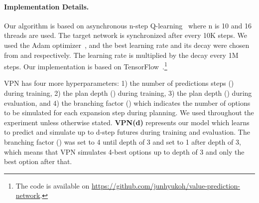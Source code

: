 \documentclass{article}
\newcommand{\cutparagraphup}{\vspace{-2pt}}
\begin{document}
\cutparagraphup
\paragraph{Implementation Details.}
Our algorithm is based on asynchronous n-step Q-learning~\citep{mnih2016asynchronous} where n is 10 and 16 threads are used. The target network is synchronized after every 10K steps. We used the Adam optimizer~\citep{Kingma2014AdamAM}, and the best learning rate and its decay were chosen from  and  respectively. The learning rate is multiplied by the decay every 1M steps. Our implementation is based on TensorFlow~\citep{Abadi2015TensorFlowLM}.\footnote{The code is available on \url{https://github.com/junhyukoh/value-prediction-network}.}

VPN has four more hyperparameters: 1) the number of predictions steps () during training, 2) the plan depth () during training, 3) the plan depth () during evaluation, and 4) the branching factor () which indicates the number of options to be simulated for each expansion step during planning. We used  throughout the experiment unless otherwise stated. \textbf{VPN(d)} represents our model which learns to predict and simulate up to d-step futures during training and evaluation. The branching factor () was set to 4 until depth of 3 and set to 1 after depth of 3, which means that VPN simulates 4-best options up to depth of 3 and only the best option after that. 

\cutparagraphup
\end{document}
